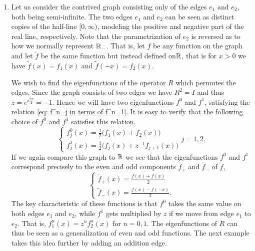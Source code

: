 \begin{example}
  \leavevmode
  \begin{enumerate}[\itshape (i)]
    \item
    Let us consider the contrived graph consisting only of the edges $e_1$ and $e_2$, both being semi-infinite. The two edges $e_1$ and $e_2$ can be seen as distinct copies of the half-line $[0,\infty)$, modeling the positive and negative part of the real line, respectively. Note that the parametrization of $e_2$ is reversed as to how we normally represent $\mathbb{R}_-$. That is, let $f$ be any function on the graph and let $\widetilde{f}$ be the same function but instead defined on$\mathbb{R}$, that is for $x>0$ we have $\widetilde{f}(x) = f_1(x)$ and $\widetilde{f}(-x) = f_2(x)$.

    We wish to find the eigenfunctions of the operator $R$ which permutes the edges. Since the graph consists of two edges we have $R^2 = I$ and thus $z = e^{i\frac{2\pi}{2}} = -1$. Hence we will have two eigenfunctions $f^0$ and $f^1$, satisfying the relation \eqref{eq: f^n_j in terms of f^n_1}. It is easy to verify that the following choice of $f^0$ and $f^1$ satisfies this relation.
    \begin{equation*}
      \begin{cases}
        f^0_j(x) = \frac{1}{2} \big( f_1(x) + f_2(x) \big) \\
        f^1_j(x) = \frac{1}{2} \big( f_j(x) + z^{-1} f_{j+1}(x) \big)
      \end{cases}
      j = 1, 2.
    \end{equation*}
    If we again compare this graph to $\mathbb{R}$ we see that the eigenfunctions $f^0$ and $f^1$ correspond precisely to the even and odd components $\widetilde{f}_+$ and $\widetilde{f}_-$ of $\widetilde{f}$,
    \begin{equation*}
      \begin{cases}
        \widetilde{f}_+(x) = \frac{f(x) + f(x)}{2} \\
        \widetilde{f}_-(x) = \frac{f(x) - f(-x)}{2}.
      \end{cases}
    \end{equation*}
    The key characteristic of these functions is that $f^0$ takes the same value on both edges $e_1$ and $e_2$, while $f^1$ gets multiplied by $z$ if we move from edge $e_1$ to $e_2$. That is, $f^n_1(x) = z^n f^n_2(x)$ for $n = 0, 1$.
    The eigenfunctions of $R$ can thus be seen as a generalization of even and odd functions. The next example takes this idea further by adding an addition edge.


\end{enumerate}
\end{example}
